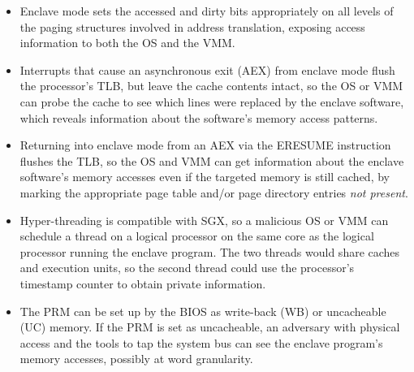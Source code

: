 \begin{itemize}

\item Enclave mode sets the accessed and dirty bits appropriately on all levels
      of the paging structures involved in address translation, exposing access
      information to both the OS and the VMM.

\item Interrupts that cause an asynchronous exit (AEX) from enclave mode flush
      the processor's TLB, but leave the cache contents intact, so the OS or
      VMM can probe the cache to see which lines were replaced by the enclave
      software, which reveals information about the software's memory access
      patterns.

\item Returning into enclave mode from an AEX via the ERESUME instruction
      flushes the TLB, so the OS and VMM can get information about the enclave
      software's memory accesses even if the targeted memory is still cached,
      by marking the appropriate page table and/or page directory entries
      \textit{not present}.

\item Hyper-threading is compatible with SGX, so a malicious OS or VMM can
      schedule a thread on a logical processor on the same core as the logical
      processor running the enclave program. The two threads would share
      caches and execution units, so the second thread could use the
      processor's timestamp counter \cite{petters1999making} to obtain private
      information.

\item The PRM can be set up by the BIOS as write-back (WB) or uncacheable (UC)
      memory. If the PRM is set as uncacheable, an adversary with physical
      access and the tools to tap the system bus can see the enclave program's
      memory accesses, possibly at word granularity.

\end{itemize}

